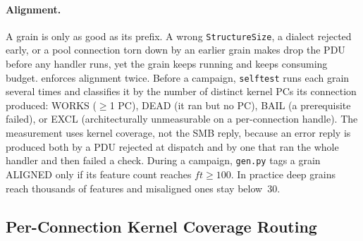 \documentclass{article}
\begin{document}
\paragraph{Alignment.} A grain is only as good as its prefix. A wrong
\texttt{StructureSize}, a dialect rejected early, or a pool connection torn
down by an earlier grain makes \ksmbd drop the PDU before any handler runs,
yet the grain keeps running and keeps consuming budget. \toolname enforces
alignment twice. Before a campaign, \texttt{selftest} runs each grain several
times and classifies it by the number of distinct kernel PCs its connection
produced: WORKS ($\geq$1 PC), DEAD (it ran but no PC), BAIL (a prerequisite
failed), or EXCL (architecturally unmeasurable on a per-connection handle).
The measurement uses kernel coverage, not the SMB reply, because an error
reply is produced both by a PDU rejected at dispatch and by one that ran the
whole handler and then failed a check. During a campaign, \texttt{gen.py}
tags a grain ALIGNED only if its \libfuzzer feature count reaches
$\mathit{ft} \geq 100$. In practice deep grains reach thousands of features
and misaligned ones stay below~30.

\subsection{Per-Connection Kernel Coverage Routing}\label{sec:route}
\end{document}
